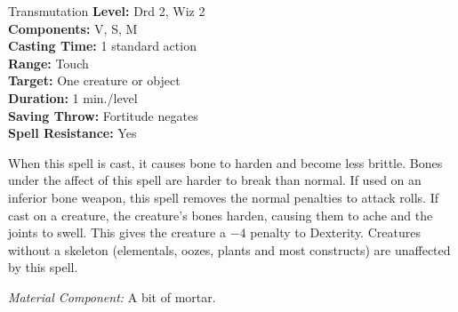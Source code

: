{Transmutation}
{
	\textbf{Level:}
	Drd 2, Wiz 2\\
	\textbf{Components:}
	V, S, M\\
	\textbf{Casting Time:}
	1 standard action\\
	\textbf{Range:}
	Touch\\
	\textbf{Target:}
	One creature or object\\
	\textbf{Duration:}
	1 min./level\\
	\textbf{Saving Throw:}
	Fortitude negates\\
	\textbf{Spell Resistance:}
	Yes\\
}
{
	When this spell is cast, it causes bone to harden and become less brittle. Bones under the affect of this spell are harder to break than normal. If used on an inferior bone weapon, this spell removes the normal penalties to attack rolls. If cast on a creature, the creature's bones harden, causing them to ache and the joints to swell. This gives the creature a $-4$ penalty to Dexterity. Creatures without a skeleton (elementals, oozes, plants and most constructs) are unaffected by this spell.

	\textit{Material Component:} A bit of mortar.
}
